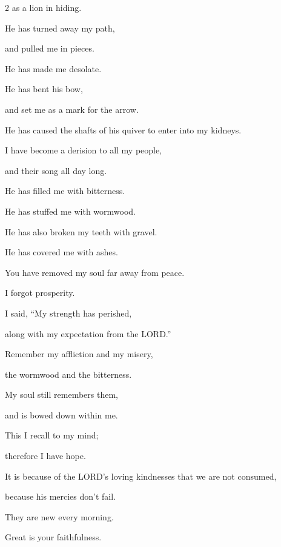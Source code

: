 \begin{multicols}{2}
	as a lion in hiding.
	
	\myverse{}He has turned away my path,
	
	and pulled me in pieces.
	
	He has made me desolate.
	
	\myverse{}He has bent his bow,
	
	and set me as a mark for the arrow.

	\vspace{\baselineskip}
	
	\myverse{}He has caused the shafts of his quiver to enter into my kidneys.
	
	\myverse{}I have become a derision to all my people,
	
	and their song all day long.
	
	\myverse{}He has filled me with bitterness.
	
	He has stuffed me with wormwood.

	\vspace{\baselineskip}
	
	\myverse{}He has also broken my teeth with gravel.
	
	He has covered me with ashes.
	
	\myverse{}You have removed my soul far away from peace.
	
	I forgot prosperity.
	
	\myverse{}I said, “My strength has perished,
	
	along with my expectation from the LORD.”

	\vspace{\baselineskip}
	
	\myverse{}Remember my affliction and my misery,
	
	the wormwood and the bitterness.
	
	\myverse{}My soul still remembers them,
	
	and is bowed down within me.
	
	\myverse{}This I recall to my mind;
	
	therefore I have hope.

	\vspace{\baselineskip}
	
	\myverse{}It is because of the LORD’s loving kindnesses that we are not
	consumed,
	
	because his mercies don’t fail.
	
	\myverse{}They are new every morning.
	
	Great is your faithfulness.
	

\end{multicols}
